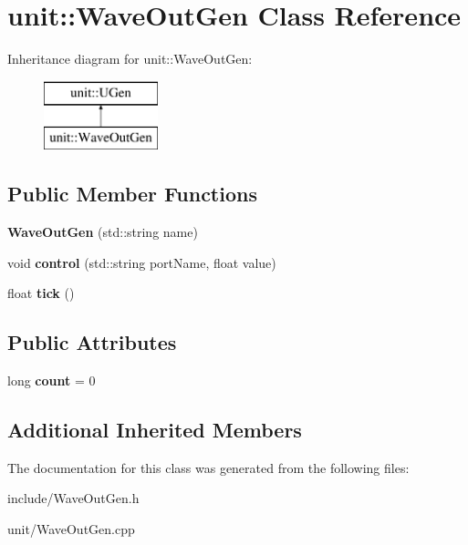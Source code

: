 \hypertarget{classunit_1_1WaveOutGen}{}\section{unit\+:\+:Wave\+Out\+Gen Class Reference}
\label{classunit_1_1WaveOutGen}
Inheritance diagram for unit\+:\+:Wave\+Out\+Gen\+:\begin{figure}[H]
\begin{center}
\leavevmode
\includegraphics[height=2.000000cm]{classunit_1_1WaveOutGen}
\end{center}
\end{figure}
\subsection*{Public Member Functions}
\begin{DoxyCompactItemize}
\item 
{\bfseries Wave\+Out\+Gen} (std\+::string name)\hypertarget{classunit_1_1WaveOutGen_af7b0343212eb3de1ed4ef2dad90ad43e}{}\label{classunit_1_1WaveOutGen_af7b0343212eb3de1ed4ef2dad90ad43e}

\item 
void {\bfseries control} (std\+::string port\+Name, float value)\hypertarget{classunit_1_1WaveOutGen_a919d71ae0729553b3bd1799add9d1088}{}\label{classunit_1_1WaveOutGen_a919d71ae0729553b3bd1799add9d1088}

\item 
float {\bfseries tick} ()\hypertarget{classunit_1_1WaveOutGen_a468581d97aaf471e6516aee2cdb630cd}{}\label{classunit_1_1WaveOutGen_a468581d97aaf471e6516aee2cdb630cd}

\end{DoxyCompactItemize}
\subsection*{Public Attributes}
\begin{DoxyCompactItemize}
\item 
long {\bfseries count} = 0\hypertarget{classunit_1_1WaveOutGen_ad8ec171f5fa4fabc328b69a2509fde0f}{}\label{classunit_1_1WaveOutGen_ad8ec171f5fa4fabc328b69a2509fde0f}

\end{DoxyCompactItemize}
\subsection*{Additional Inherited Members}


The documentation for this class was generated from the following files\+:\begin{DoxyCompactItemize}
\item 
include/Wave\+Out\+Gen.\+h\item 
unit/Wave\+Out\+Gen.\+cpp\end{DoxyCompactItemize}
